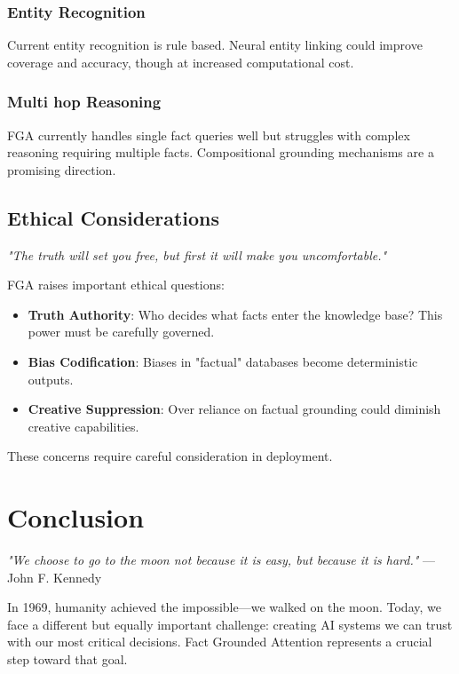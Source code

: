 \documentclass[11pt, a4paper]{article}
\theoremstyle{definition}
\begin{document}
\subsubsection{Entity Recognition}
Current entity recognition is rule based. Neural entity linking could improve coverage and accuracy, though at increased computational cost.

\subsubsection{Multi hop Reasoning}
FGA currently handles single fact queries well but struggles with complex reasoning requiring multiple facts. Compositional grounding mechanisms are a promising direction.

\subsection{Ethical Considerations}

\textit{"The truth will set you free, but first it will make you uncomfortable."}

FGA raises important ethical questions:

\begin{itemize}
    \item \textbf{Truth Authority}: Who decides what facts enter the knowledge base? This power must be carefully governed.
    \item \textbf{Bias Codification}: Biases in "factual" databases become deterministic outputs.
    \item \textbf{Creative Suppression}: Over reliance on factual grounding could diminish creative capabilities.
\end{itemize}

These concerns require careful consideration in deployment.

\section{Conclusion}

\textit{"We choose to go to the moon not because it is easy, but because it is hard."} —John F. Kennedy

In 1969, humanity achieved the impossible—we walked on the moon. Today, we face a different but equally important challenge: creating AI systems we can trust with our most critical decisions. Fact Grounded Attention represents a crucial step toward that goal.
\end{document}
